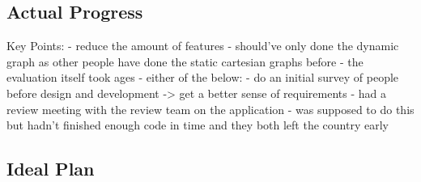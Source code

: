 \subsection{Actual Progress}

Key Points:
- reduce the amount of features
    - should've only done the dynamic graph as other people have done the static cartesian graphs before
    - the evaluation itself took ages 
- either of the below:
    - do an initial survey of people before design and development -> get a better sense of requirements
    - had a review meeting with the review team on the application - was supposed to do this but hadn't finished enough code in time and they both left the country early

\subsection{Ideal Plan}
